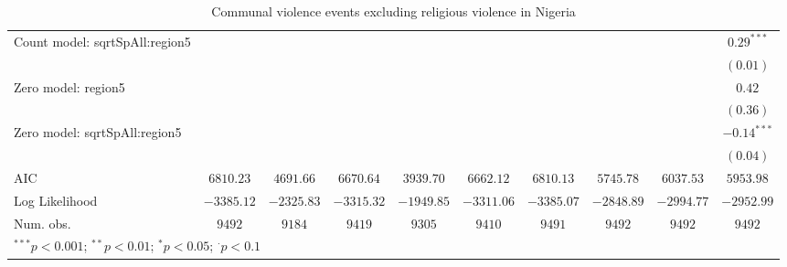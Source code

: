 \begin{sidewaystable}
\begin{center}
{\begin{tabular}{l c c c c c c c c c}
Count model: sqrtSpAll:region5 &                &               &                &                 &                &                &                 &                 & $0.29^{***}$   \\
                               &                &               &                &                 &                &                &                 &                 & $(0.01)$       \\
Zero model: region5            &                &               &                &                 &                &                &                 &                 & $0.42$         \\
                               &                &               &                &                 &                &                &                 &                 & $(0.36)$       \\
Zero model: sqrtSpAll:region5  &                &               &                &                 &                &                &                 &                 & $-0.14^{***}$  \\
                               &                &               &                &                 &                &                &                 &                 & $(0.04)$       \\
\midrule
AIC                            & $6810.23$      & $4691.66$     & $6670.64$      & $3939.70$       & $6662.12$      & $6810.13$      & $5745.78$       & $6037.53$       & $5953.98$      \\
Log Likelihood                 & $-3385.12$     & $-2325.83$    & $-3315.32$     & $-1949.85$      & $-3311.06$     & $-3385.07$     & $-2848.89$      & $-2994.77$      & $-2952.99$     \\
Num. obs.                      & $9492$         & $9184$        & $9419$         & $9305$          & $9410$         & $9491$         & $9492$          & $9492$          & $9492$         \\
\bottomrule
\multicolumn{10}{l}{\scriptsize{$^{***}p<0.001$; $^{**}p<0.01$; $^{*}p<0.05$; $^{\cdot}p<0.1$}}
\end{tabular}
}
\caption{Communal violence events excluding religious violence
	       in Nigeria}
\label{zorg3nigreldif}
\end{center}
\end{sidewaystable}
